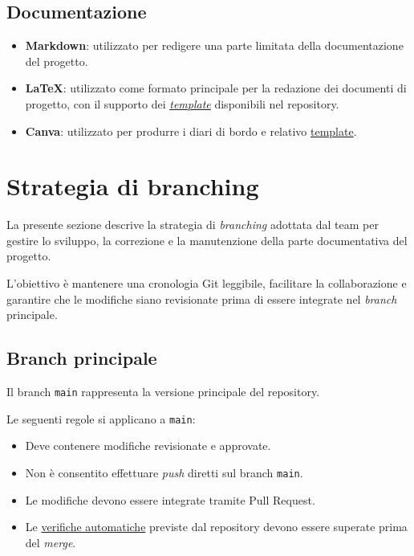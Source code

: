 \documentclass[11pt, a4paper]{article}
\begin{document}
\subsection{Documentazione}
\begin{itemize}
    \item \textbf{Markdown}: utilizzato per redigere una parte limitata della documentazione del progetto.
    \item \textbf{LaTeX}: utilizzato come formato principale per la redazione dei documenti di progetto, con il supporto dei \href{https://github.com/On-By-One-Team/On-By-One.github.io/blob/main/docs/tex/templates}{\textit{template}} disponibili nel repository.
    \item \textbf{Canva}: utilizzato per produrre i diari di bordo e relativo \href{https://www.canva.com/design/DAXYpWf746s/uXPPm-JCKg6TbuRorlvcWQ/view?utm_content=DAXYpWf746s&utm_campaign=designshare&utm_medium=link&utm_source=publishsharelink&mode=preview}{template}.
\end{itemize}

\section{Strategia di branching}
\label{sec:strategia-di-branching}

La presente sezione descrive la strategia di \textit{branching} adottata dal team per gestire lo sviluppo, la correzione e la manutenzione della parte documentativa del progetto.

L'obiettivo è mantenere una cronologia Git leggibile, facilitare la collaborazione e garantire che le modifiche siano revisionate prima di essere integrate nel \textit{branch} principale.

\subsection{Branch principale}

Il branch \texttt{main} rappresenta la versione principale del repository.

Le seguenti regole si applicano a \texttt{main}:
\begin{itemize}
    \item Deve contenere modifiche revisionate e approvate.
    \item Non è consentito effettuare \textit{push} diretti sul branch \texttt{main}.
    \item Le modifiche devono essere integrate tramite Pull Request.
    \item Le \href{https://github.com/On-By-One-Team/On-By-One.github.io/blob/main/.github/workflows}{verifiche automatiche} previste dal repository devono essere superate prima del \textit{merge}.
\end{itemize}
\end{document}
